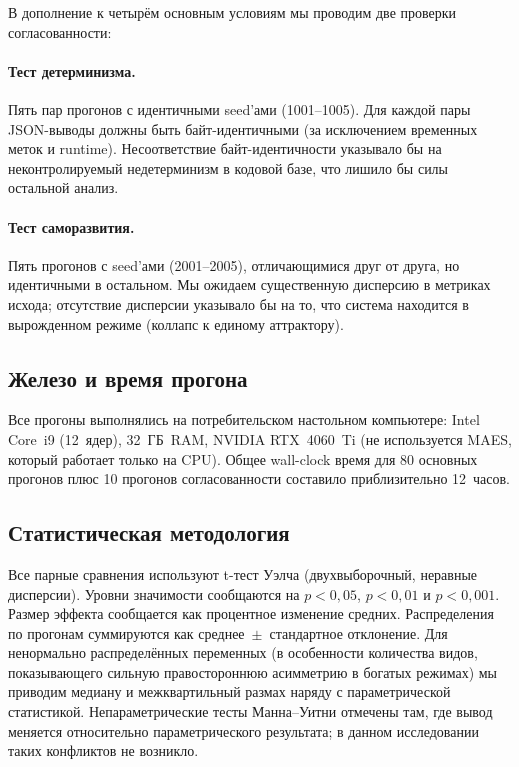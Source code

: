 \documentclass[11pt,a4paper]{article}
\begin{document}
В дополнение к четырём основным условиям мы проводим две проверки
согласованности:

\paragraph{Тест детерминизма.} Пять пар прогонов с идентичными
seed'ами (1001--1005). Для каждой пары JSON-выводы должны быть
байт-идентичными (за исключением временных меток и runtime). Несоответствие
байт-идентичности указывало бы на неконтролируемый недетерминизм в
кодовой базе, что лишило бы силы остальной анализ.

\paragraph{Тест саморазвития.} Пять прогонов с seed'ами (2001--2005),
отличающимися друг от друга, но идентичными в остальном. Мы ожидаем
существенную дисперсию в метриках исхода; отсутствие дисперсии
указывало бы на то, что система находится в вырожденном режиме
(коллапс к единому аттрактору).

\subsection{Железо и время прогона}

Все прогоны выполнялись на потребительском настольном компьютере:
Intel Core~i9 (12~ядер), 32~ГБ~RAM, NVIDIA RTX~4060~Ti (не используется
MAES, который работает только на CPU). Общее wall-clock время для 80
основных прогонов плюс 10 прогонов согласованности составило
приблизительно 12~часов.

\subsection{Статистическая методология}

Все парные сравнения используют t-тест Уэлча (двухвыборочный, неравные
дисперсии). Уровни значимости сообщаются на $p<0,05$, $p<0,01$ и
$p<0,001$. Размер эффекта сообщается как процентное изменение средних.
Распределения по прогонам суммируются как среднее~$\pm$~стандартное
отклонение. Для ненормально распределённых переменных (в особенности
количества видов, показывающего сильную правостороннюю асимметрию в
богатых режимах) мы приводим медиану и межквартильный размах наряду с
параметрической статистикой. Непараметрические тесты Манна--Уитни
отмечены там, где вывод меняется относительно параметрического
результата; в данном исследовании таких конфликтов не возникло.
\end{document}

